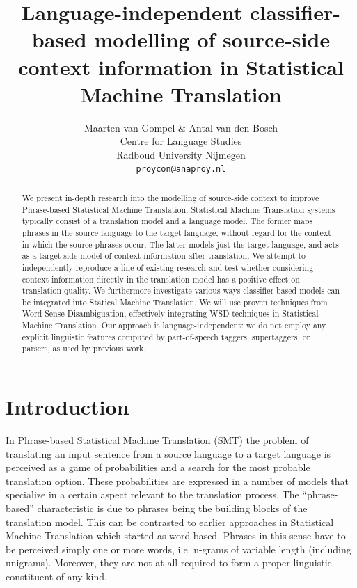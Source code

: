 \documentclass[smallextended]{svjour3}       %
\title{Language-independent classifier-based modelling of source-side context information in Statistical Machine Translation}
\author{Maarten van Gompel \& Antal van den Bosch \\
 Centre for Language Studies \\
  Radboud University Nijmegen \\
  {\tt proycon@anaproy.nl}}
\theoremstyle{break}
\begin{document}
\maketitle

\begin{abstract} 
We present in-depth research into the modelling of source-side
context to improve Phrase-based Statistical Machine Translation. Statistical
Machine Translation systems typically consist of a translation model and a
language model. The former maps phrases in the source language to the target
language, without regard for the context in which the source phrases occur. The
latter models just the target language, and acts as a target-side model of
context information after translation. We attempt to independently reproduce a
line of existing research and test whether considering context information
directly in the translation model has a positive effect on translation quality.
We furthermore investigate various ways classifier-based models can be
integrated into Statical Machine Translation.  We will use proven techniques
from Word Sense Disambiguation, effectively integrating WSD techniques in
Statistical Machine Translation. Our approach is language-independent:
we do not employ any explicit linguistic features computed by
part-of-speech taggers, supertaggers, or parsers, as used by previous work.
\end{abstract}

\section{Introduction}

In Phrase-based Statistical Machine Translation (SMT) the problem of
translating an input sentence from a source language to a target language is
perceived as a game of probabilities and a search for the most probable
translation option.  These probabilities are expressed in a number of models
that specialize in a certain aspect relevant to the translation process. The
``phrase-based'' characteristic is due to phrases being the building blocks of
the translation model. This can be contrasted to earlier approaches in
Statistical Machine Translation which started as word-based.  Phrases in this
sense have to be perceived simply one or more words, i.e.  n-grams of variable
length (including unigrams). Moreover, they are not at all required to form a
proper linguistic constituent of any kind.
\end{document}
